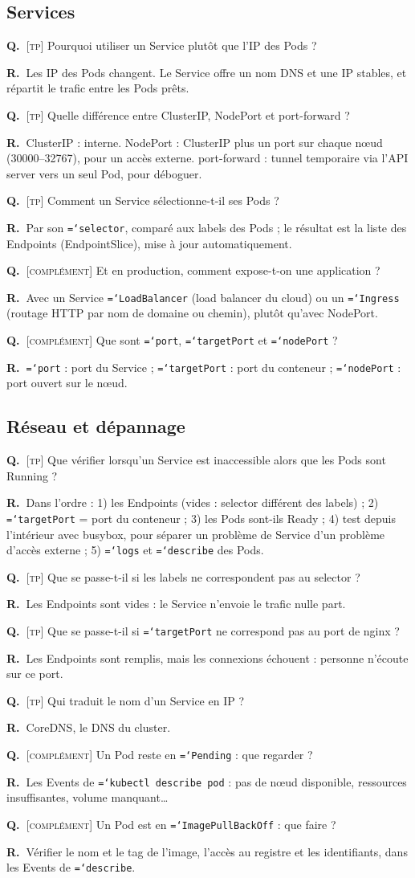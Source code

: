 \documentclass[11pt,a4paper]{article}
\newcommand{\cmd}[1]{\texttt{\hyphenchar\font=`\-#1}}
\newcommand{\tp}{\textsc{[tp]}}
\newcommand{\compl}{\textsc{[complément]}}
\newcommand{\QR}[2]{\needspace{4\baselineskip}\par\noindent\textbf{Q.~}#1\par\nopagebreak\noindent\textbf{R.~}#2\par\medskip}
\begin{document}
\subsection{Services}
\QR{\tp{} Pourquoi utiliser un Service plutôt que l'IP des Pods ?}{Les IP des Pods changent. Le Service offre un nom DNS et une IP stables, et répartit le trafic entre les Pods prêts.}
\QR{\tp{} Quelle différence entre ClusterIP, NodePort et port-forward ?}{ClusterIP : interne. NodePort : ClusterIP plus un port sur chaque nœud (30000--32767), pour un accès externe. port-forward : tunnel temporaire via l'API server vers un seul Pod, pour déboguer.}
\QR{\tp{} Comment un Service sélectionne-t-il ses Pods ?}{Par son \cmd{selector}, comparé aux labels des Pods ; le résultat est la liste des Endpoints (EndpointSlice), mise à jour automatiquement.}
\QR{\compl{} Et en production, comment expose-t-on une application ?}{Avec un Service \cmd{LoadBalancer} (load balancer du cloud) ou un \cmd{Ingress} (routage HTTP par nom de domaine ou chemin), plutôt qu'avec NodePort.}
\QR{\compl{} Que sont \cmd{port}, \cmd{targetPort} et \cmd{nodePort} ?}{\cmd{port} : port du Service ; \cmd{targetPort} : port du conteneur ; \cmd{nodePort} : port ouvert sur le nœud.}

\subsection{Réseau et dépannage}
\QR{\tp{} Que vérifier lorsqu'un Service est inaccessible alors que les Pods sont Running ?}{Dans l'ordre : 1) les Endpoints (vides : selector différent des labels) ; 2) \cmd{targetPort} = port du conteneur ; 3) les Pods sont-ils Ready ; 4) test depuis l'intérieur avec busybox, pour séparer un problème de Service d'un problème d'accès externe ; 5) \cmd{logs} et \cmd{describe} des Pods.}
\QR{\tp{} Que se passe-t-il si les labels ne correspondent pas au selector ?}{Les Endpoints sont vides : le Service n'envoie le trafic nulle part.}
\QR{\tp{} Que se passe-t-il si \cmd{targetPort} ne correspond pas au port de nginx ?}{Les Endpoints sont remplis, mais les connexions échouent : personne n'écoute sur ce port.}
\QR{\tp{} Qui traduit le nom d'un Service en IP ?}{CoreDNS, le DNS du cluster.}
\QR{\compl{} Un Pod reste en \cmd{Pending} : que regarder ?}{Les Events de \cmd{kubectl describe pod} : pas de nœud disponible, ressources insuffisantes, volume manquant\ldots}
\QR{\compl{} Un Pod est en \cmd{ImagePullBackOff} : que faire ?}{Vérifier le nom et le tag de l'image, l'accès au registre et les identifiants, dans les Events de \cmd{describe}.}
\end{document}
